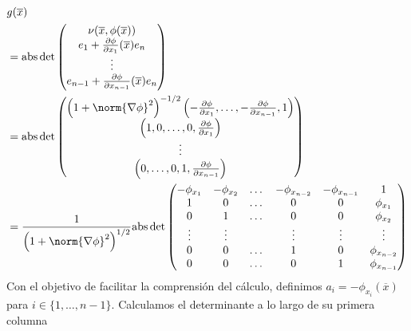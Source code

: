 \documentclass{report}
\theoremstyle{remark}
\begin{document}
  \begin{align}
    &g(\overline{x})
    \\
    &=
    \text{abs} \det
    \begin{pmatrix}
      \nu(\overline{x}, \phi(\overline{x}))
      \\
      e_1
      +
      \frac{\partial \phi}{\partial x_1}(\overline{x})
      e_n
      \\
      \vdots
      \\
      e_{n - 1}
      +
      \frac{\partial \phi}{\partial x_{n - 1}}(\overline{x})
      e_n
    \end{pmatrix}
    \\
    &=
    \text{abs} \det
    \begin{pmatrix}
      \left( 1 + \norm{\nabla \phi}^2 \right)^{- 1 / 2}
    \left(
      - \frac{\partial \phi}{\partial x_1}, \dots, - \frac{\partial \phi}{\partial x_{n - 1}},
      1
    \right)
      \\
      \left(
        1,
        0, \dots, 0,
        \frac{\partial \phi}{\partial x_1}
      \right)
      \\
      \vdots
      \\
      \left(
        0, \dots, 0,
        1,
        \frac{\partial \phi}{\partial x_{n - 1}}
      \right)
    \end{pmatrix}
    \\
    &=
    \frac{1}{\left( 1 + \norm{\nabla \phi}^2 \right)^{1/2}}
    \text{abs} \det
    \begin{pmatrix}
      - \phi_{x_1}
      &- \phi_{x_2}
      &\dots
      &- \phi_{x_{n - 2}}
      &- \phi_{x_{n - 1}}
      &1
      \\
      1
      &0
      &\dots
      &0
      &0
      &\phi_{x_1}
      \\
      0
      &1
      &\dots
      &0
      &0
      &\phi_{x_2}
      \\
      \vdots
      &\vdots
      &
      &\vdots
      &\vdots
      &\vdots
      \\
      0
      &0
      &\dots
      &1
      &0
      &\phi_{x_{n - 2}}
      \\
      0
      &0
      &\dots
      &0
      &1
      &\phi_{x_{n - 1}}
    \end{pmatrix}
  \end{align}
  Con el objetivo de facilitar la comprensión del cálculo, definimos \(a_i = - \phi_{x_i} (\overline{x})\) para \(i \in \{1, \dots, n - 1\}\).
  Calculamos el determinante a lo largo de su primera columna
\end{document}
